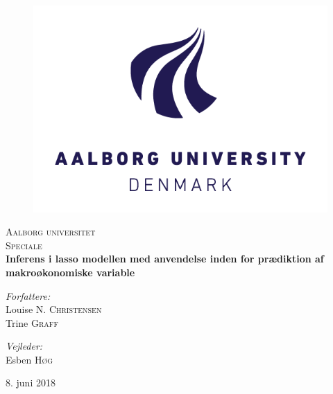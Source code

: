 \begin{titlepage}
\begin{center}


\begin{figure}[htbp]
	\centering
	\includegraphics[width=\textwidth]{./fig/aaulogo.jpg}
\end{figure}

\vspace{2cm}


\textsc{\LARGE Aalborg universitet}\\
\textsc{\Large Speciale}\\[0.5cm]

{ \huge \bfseries Inferens i lasso modellen med anvendelse inden for prædiktion af makroøkonomiske variable \\[1.4cm] }



\begin{minipage}{0.4\textwidth}
\begin{flushleft} \large
\emph{Forfattere:}\\
Louise  \textsc{N. Christensen}\\
Trine \textsc{Graff}\\

\end{flushleft}
\end{minipage}
\begin{minipage}{0.4\textwidth}
\begin{flushright} \large
\emph{Vejleder:} \\
Esben \textsc{Høg}\\
\phantom{hej}

\end{flushright}
\end{minipage}

\vfill

{\large 8. juni 2018}

\end{center}
\end{titlepage}
